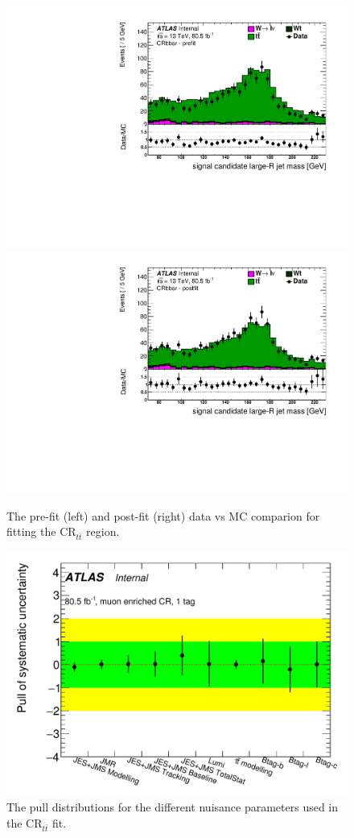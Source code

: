 \begin{figure}[!htbp]
\centering
\includegraphics[width=0.49\linewidth]{figures/backgrounds/ttbar_prefit} \hfill
\includegraphics[width=0.49\linewidth]{figures/backgrounds/ttbar_postfit}
\caption{The pre-fit (left) and post-fit (right) data vs MC comparion for fitting the $\text{CR}_{t\bar{t}}$ region.}
\label{sec:background:ttbar_fit}
\end{figure}

\begin{figure}[!htbp]
\centering
\includegraphics[width=0.7\linewidth]{figures/backgrounds/ttbar_pulls}
\caption{The pull distributions for the different nuisance parameters used in the $\text{CR}_{t\bar{t}}$ fit.}
\label{sec:background:ttbar_pulls}
\end{figure}
